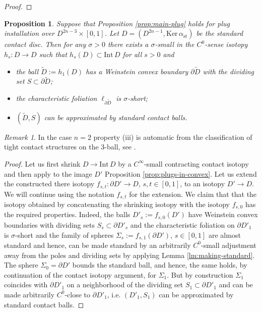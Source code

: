 \documentclass[12pt]{amsart}
\theoremstyle{plain}
\newtheorem{prop}[theorem]{Proposition}
\theoremstyle{definition}
\theoremstyle{remark}
\newtheorem{remark}[theorem]{Remark}
\newcommand{\p}{\partial}
\newcommand{\wt}{\widetilde}
\newcommand{\Int}{\mathrm{Int\,}}
\newcommand{\Ker}{\mathrm{Ker\,}}
\newcommand{\st}{\mathrm{st}}
\begin{document}
\begin{proof}
  \end{proof}
  
 \begin{prop}\label{prop:making-short-approx} Suppose that Proposition \ref{prop:main-plug}  holds for plug installation over $D^{2n-3}\times[0,1]$. Let $D=(D^{2n-1},\Ker\alpha_\st)$ be the standard contact disc. Then for any $\sigma>0$ there exists a  $\sigma$-small in the  $C^0$-sense  isotopy $h_s:D\to D$     such that $h_s(D)\subset\Int D$ for all $s>0$ and 
 \begin{itemize}
 \item[(i)] the ball $\wt D:=h_1(D)$ has a Weinstein convex boundary  $\p\wt D$ with the dividing set $S\subset\p\wt D$;
 \item[(ii)] the characteristic foliation $\ell_{\p\wt D}$ is $\sigma$-short;
 \item[(iii)] $(\wt D,S)$ can be approximated by standard contact balls.
 \end{itemize}
 \end{prop}
 \begin{remark} \label{rem:tight}
 In the case $n=2$ property (iii) is automatic from the classification of tight contact structures on the $3$-ball, see \cite{El-tight}.
 \end{remark}

\begin{proof}
 Let us first shrink $D\to \Int D$ by a $C^\infty$-small contracting contact isotopy and then apply to the image $D'$   Proposition \ref{prop:plugs-in-convex}. Let us extend the constructed there isotopy   $f_{s,t}:\p D'\to D$, $s,t\in[0,1]$,  to an isotopy $D'\to D$. We will continue using the notation $f_{s,t}$ for the extension.  We claim that that the isotopy obtained by concatenating the shrinking isotopy with the isotopy $f_{s,0}$ has the required properties. Indeed, the balls 
 $D'_s:=f_{s,0}(D')$ have Weinstein convex boundaries with dividing sets $S_s\subset \p D'_s$  and the characteristic foliation on  $\p D'_1$ is   $\sigma$-short 
 and the family of spheres $\Sigma_s:=f_{s,1}(\p D')$, $s\in[0,1]$ are almost standard  and hence, can be made standard by an arbitrarily $C^0$-small adjustment away from the poles and dividing sets by applying 
  Lemma \ref{lm:making-standard}. The sphere $\Sigma_0=\p D'$ bounds the standard ball, and hence, the same holds, by continuation of the contact isotopy argument, for $\Sigma_1$. But by construction $\Sigma_1$ coincides with $\p D'_1$ on a neighborhood of the dividing set $S_1\subset \p D'_1$ and  can be made arbitrarily $C^0$-close to $\p D'_1$, i.e. $(D'_1,S_1)$ can be approximated by standard contact balls.
\end{proof}
\end{document}
